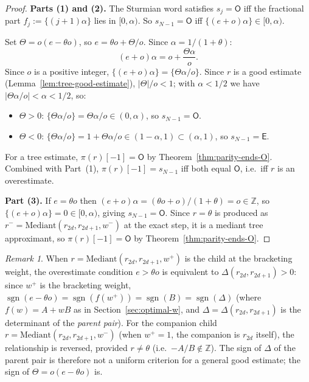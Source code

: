 \documentclass[12pt]{article}
\theoremstyle{definition}
\theoremstyle{remark}
\newtheorem{remark}[theorem]{Remark}
\theoremstyle{plain}
\newcommand{\OO}{\mathsf{O}}
\newcommand{\EE}{\mathsf{E}}
\newcommand{\Kval}{\Theta}
\newcommand{\Dval}{\Delta}
\newcommand{\wplus}{w^{+}}
\newcommand{\wminus}{w^{-}}
\begin{document}
\begin{proof}
\textbf{Parts (1) and (2).}
The Sturmian word satisfies $s_j = \OO$ iff the fractional part
$f_j := \{(j+1)\alpha\}$ lies in $[0, \alpha)$.
So $s_{N-1} = \OO$ iff $\{(e+o)\alpha\} \in [0,\alpha)$.

Set $\Kval = o(e - \theta o)$, so $e = \theta o + \Kval/o$.
Since $\alpha = 1/(1+\theta)$:
\[
  (e+o)\alpha = o + \frac{\Kval\alpha}{o}.
\]
Since $o$ is a positive integer, $\{(e+o)\alpha\} = \{\Kval\alpha/o\}$.
Since $r$ is a good estimate (Lemma~\ref{lem:tree-good-estimate}), $|\Kval|/o < 1$; with $\alpha < 1/2$ we have
$|\Kval\alpha/o| < \alpha < 1/2$, so:
\begin{itemize}
  \item $\Kval > 0$: $\{\Kval\alpha/o\} = \Kval\alpha/o \in (0,\alpha)$, so $s_{N-1} = \OO$.
  \item $\Kval < 0$: $\{\Kval\alpha/o\} = 1 + \Kval\alpha/o \in (1-\alpha,1) \subset (\alpha,1)$,
        so $s_{N-1} = \EE$.
\end{itemize}
For a tree estimate, $\pi(r)[-1] = \OO$ by Theorem~\ref{thm:parity-ends-O}.
Combined with Part~(1), $\pi(r)[-1] = s_{N-1}$ iff both equal $\OO$, i.e.\ iff $r$ is an overestimate.

\textbf{Part (3).}
If $e = \theta o$ then $(e+o)\alpha = (\theta o + o)/(1+\theta) = o \in \mathbb{Z}$,
so $\{(e+o)\alpha\} = 0 \in [0,\alpha)$, giving $s_{N-1} = \OO$.
Since $r = \theta$ is produced as $r^- = \mathrm{Mediant}(r_{2d}, r_{2d+1}, \wminus)$ at
the exact step, it is a mediant tree approximant, so $\pi(r)[-1] = \OO$ by
Theorem~\ref{thm:parity-ends-O}.
\end{proof}

\begin{remark}\label{rem:overestimate-parent}
When $r = \mathrm{Mediant}(r_{2d}, r_{2d+1}, \wplus)$ is the child at the bracketing weight,
the overestimate condition $e > \theta o$ is equivalent to $\Dval(r_{2d}, r_{2d+1}) > 0$: since
$\wplus$ is the bracketing weight, $\operatorname{sgn}(e - \theta o) = \operatorname{sgn}(f(\wplus)) = \operatorname{sgn}(B) = \operatorname{sgn}(\Dval)$
(where $f(w) = A + wB$ as in Section~\ref{sec:optimal-w}, and $\Dval = \Dval(r_{2d}, r_{2d+1})$
is the determinant of the \emph{parent pair}).
For the companion child $r = \mathrm{Mediant}(r_{2d}, r_{2d+1}, \wminus)$
(when $\wplus = 1$, the companion is $r_{2d}$ itself), the relationship is reversed,
provided $r \neq \theta$ (i.e.\ $-A/B \notin \mathbb{Z}$).
The sign of $\Dval$ of the parent pair is therefore not a uniform criterion for a general good estimate;
the sign of $\Kval = o(e - \theta o)$ is.
\end{remark}
\end{document}
